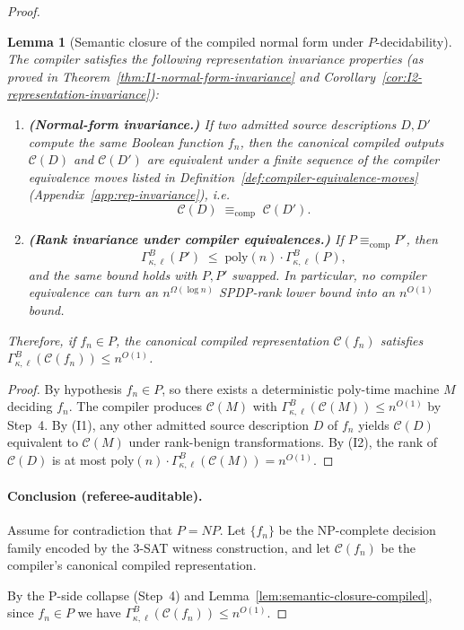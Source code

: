 \documentclass[12pt]{article}
\newcommand{\poly}{\mathrm{poly}}
\newcommand{\Comp}{\mathcal{C}}
\newtheorem{lemma}[theorem]{Lemma}
\theoremstyle{definition}
\theoremstyle{definition}
\theoremstyle{remark}
\theoremstyle{remark}
\begin{document}
\begin{proof}
\begin{lemma}[Semantic closure of the compiled normal form under $P$-decidability]
The compiler satisfies the following representation invariance properties
(as proved in Theorem~\ref{thm:I1-normal-form-invariance}
and Corollary~\ref{cor:I2-representation-invariance}):

\begin{enumerate}[label=(I\arabic*)]
\item \textbf{(Normal-form invariance.)}
If two admitted source descriptions $D,D'$ compute the same Boolean function $f_n$,
then the canonical compiled outputs $\Comp(D)$ and $\Comp(D')$ are equivalent under a finite
sequence of the \emph{compiler equivalence moves} listed in
Definition~\ref{def:compiler-equivalence-moves} (Appendix~\ref{app:rep-invariance}), i.e.
\[
\Comp(D)\;\equiv_{\mathrm{comp}}\; \Comp(D').
\]

\item \textbf{(Rank invariance under compiler equivalences.)}
If $P \equiv_{\mathrm{comp}} P'$, then
\[
\Gamma^{B}_{\kappa,\ell}(P') \;\le\; \mathrm{poly}(n)\cdot \Gamma^{B}_{\kappa,\ell}(P),
\]
and the same bound holds with $P,P'$ swapped. In particular, no compiler equivalence
can turn an $n^{\Omega(\log n)}$ SPDP-rank lower bound into an $n^{O(1)}$ bound.
\end{enumerate}

Therefore, if $f_n\in P$, the canonical compiled representation $\Comp(f_n)$ satisfies
$\Gamma^{B}_{\kappa,\ell}(\Comp(f_n))\le n^{O(1)}$.
\end{lemma}

\begin{proof}
By hypothesis $f_n\in P$, so there exists a deterministic poly-time machine $M$ deciding $f_n$.
The compiler produces $\Comp(M)$ with $\Gamma^{B}_{\kappa,\ell}(\Comp(M))\le n^{O(1)}$ by Step~4.
By (I1), any other admitted source description $D$ of $f_n$ yields $\Comp(D)$ equivalent to
$\Comp(M)$ under rank-benign transformations.  By (I2), the rank of $\Comp(D)$ is at most
$\poly(n)\cdot\Gamma^{B}_{\kappa,\ell}(\Comp(M))=n^{O(1)}$.
\end{proof}

\paragraph{Conclusion (referee-auditable).}
Assume for contradiction that $P=NP$.  Let $\{f_n\}$ be the NP-complete decision family
encoded by the 3-SAT witness construction, and let $\Comp(f_n)$ be the compiler's canonical
compiled representation.

By the P-side collapse (Step~4) and Lemma~\ref{lem:semantic-closure-compiled}, since $f_n\in P$
we have $\Gamma^{B}_{\kappa,\ell}(\Comp(f_n))\le n^{O(1)}$.


\end{proof}
\end{document}
